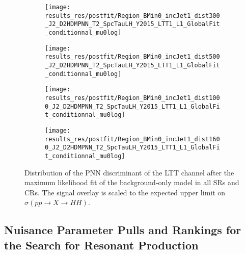 \begin{figure}[htbp]
  \centering

  \begin{subfigure}{0.495\textwidth}
    \centering

    \texttt{[image: results\_res/postfit/Region\_BMin0\_incJet1\_dist300\_J2\_D2HDMPNN\_T2\_SpcTauLH\_Y2015\_LTT1\_L1\_GlobalFit\_conditionnal\_mu0log]}
  \end{subfigure}\hfill%
  \begin{subfigure}{0.495\textwidth}
    \centering

    \texttt{[image: results\_res/postfit/Region\_BMin0\_incJet1\_dist500\_J2\_D2HDMPNN\_T2\_SpcTauLH\_Y2015\_LTT1\_L1\_GlobalFit\_conditionnal\_mu0log]}
  \end{subfigure}

  \begin{subfigure}{0.495\textwidth}
    \centering

    \texttt{[image: results\_res/postfit/Region\_BMin0\_incJet1\_dist1000\_J2\_D2HDMPNN\_T2\_SpcTauLH\_Y2015\_LTT1\_L1\_GlobalFit\_conditionnal\_mu0log]}
  \end{subfigure}\hfill%
  \begin{subfigure}{0.495\textwidth}
    \centering

    \texttt{[image: results\_res/postfit/Region\_BMin0\_incJet1\_dist1600\_J2\_D2HDMPNN\_T2\_SpcTauLH\_Y2015\_LTT1\_L1\_GlobalFit\_conditionnal\_mu0log]}
  \end{subfigure}

  \caption{Distribution of the PNN discriminant of the \lephad LTT
    channel after the maximum likelihood fit of the background-only
    model in all SRs and CRs. The signal overlay is
    scaled to the expected upper limit on $\sigma(pp \to X \to HH)$.}
\end{figure}


\clearpage
\subsection{Nuisance Parameter Pulls and Rankings for the Search for Resonant
  \HH Production}%
\label{app:rankings_resonant}

